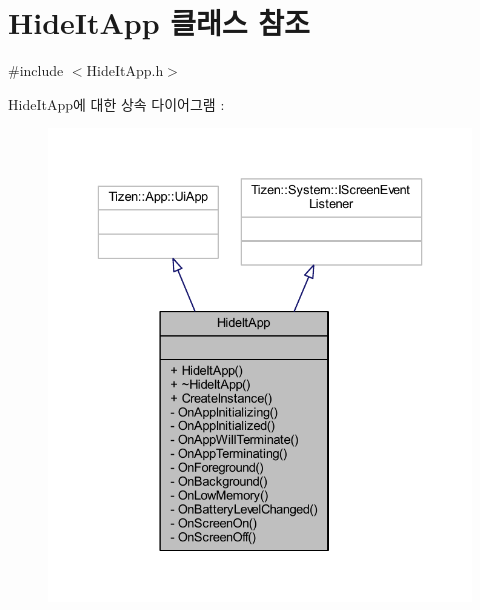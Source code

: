 \hypertarget{class_hide_it_app}{\section{Hide\+It\+App 클래스 참조}
\label{class_hide_it_app}
}


{\ttfamily \#include $<$Hide\+It\+App.\+h$>$}



Hide\+It\+App에 대한 상속 다이어그램 \+: 
\nopagebreak
\begin{figure}[H]
\begin{center}
\leavevmode
\includegraphics[width=336pt]{class_hide_it_app__inherit__graph}
\end{center}
\end{figure}


